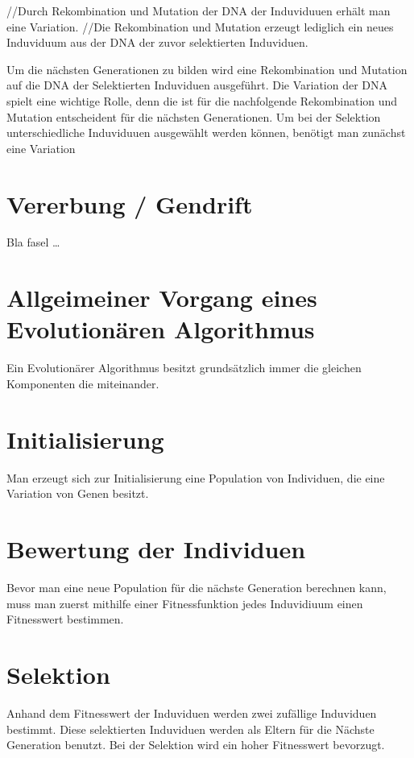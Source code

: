 //Durch Rekombination und Mutation der DNA der Induviduuen erhält man eine Variation. 
//Die Rekombination und Mutation erzeugt lediglich ein neues Induviduum aus der DNA der zuvor selektierten Induviduen.

Um die nächsten Generationen zu bilden wird eine Rekombination und Mutation auf die DNA der Selektierten Induviduen ausgeführt. 
Die Variation der DNA  spielt eine wichtige Rolle, denn die ist für die nachfolgende Rekombination und Mutation entscheident für die nächsten Generationen. 
Um bei der Selektion unterschiedliche Induviduuen ausgewählt werden können, benötigt man zunächst eine Variation 

\section{Vererbung / Gendrift}
\label{ch:Grundlagen:sec:Taktile Geräte:sec:Variation}
Bla fasel \dots

\section{Allgeimeiner Vorgang eines Evolutionären Algorithmus}
\label{ch:Grundlagen:sec:Taktile Geräte:sec:Allgeimeiner Vorgang eines Evolutionären Algorithmus}
Ein Evolutionärer Algorithmus besitzt grundsätzlich immer die gleichen Komponenten die miteinander.

\section{Initialisierung}
\label{ch:Grundlagen:sec:Initialisierung}
Man erzeugt sich zur Initialisierung eine Population von Individuen, die eine Variation von Genen besitzt. 

\section{Bewertung der Individuen}
\label{ch:Grundlagen:sec:Bewertung der Individuen}
Bevor man eine neue Population für die nächste Generation berechnen kann, muss man zuerst mithilfe einer Fitnessfunktion jedes Induvidiuum einen Fitnesswert bestimmen. 

\section{Selektion}
\label{ch:Grundlagen:sec:Selektion}
Anhand dem Fitnesswert der Induviduen werden zwei zufällige Induviduen bestimmt. Diese selektierten Induviduen werden als Eltern für die Nächste Generation benutzt.
Bei der Selektion wird ein hoher Fitnesswert bevorzugt.

